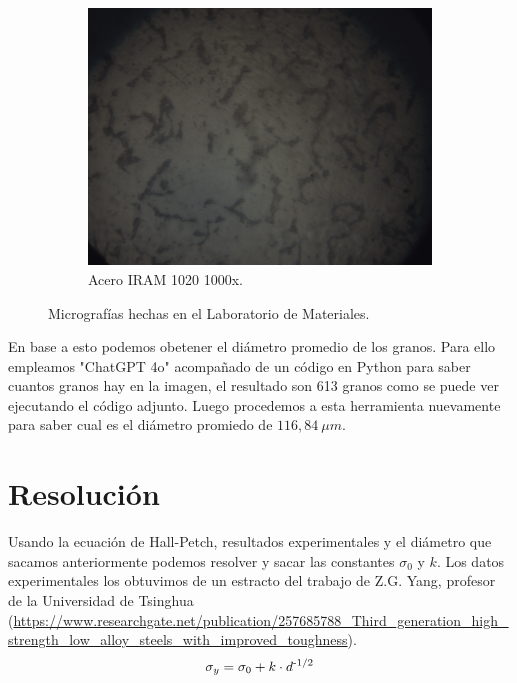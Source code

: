 \documentclass[12pt,a4paper]{article}
\begin{document}
\begin{figure}[h]
    \vspace{1em}

    \begin{subfigure}[b]{0.6\linewidth}
        \centering
        \includegraphics[width=\linewidth]{Figuras/Del-Rio_8.png}
        \caption{Acero IRAM 1020 1000x.}
        \label{1000x}
    \end{subfigure}
    \caption{Micrografías hechas en el Laboratorio de Materiales.}
\end{figure}
En base a esto podemos obetener el diámetro promedio de los granos. Para ello empleamos "ChatGPT 4o" acompañado de un código en Python para saber cuantos granos hay en la imagen, el resultado son 613 granos como se puede ver ejecutando el código adjunto. Luego procedemos a esta herramienta nuevamente para saber cual es el diámetro promiedo de $116,84\: \mu m$.

\section{Resolución}
Usando la ecuación de Hall-Petch, resultados experimentales y el diámetro que sacamos anteriormente podemos resolver y sacar las constantes $\sigma_0$ y $k$. Los datos experimentales los obtuvimos de un estracto del trabajo de Z.G. Yang, profesor de la Universidad de Tsinghua (\url{https://www.researchgate.net/publication/257685788_Third_generation_high_strength_low_alloy_steels_with_improved_toughness}).
\begin{equation}
    \sigma_y = \sigma_0 +k\cdot d \textsuperscript{-1/2}
\end{equation}
\end{document}

